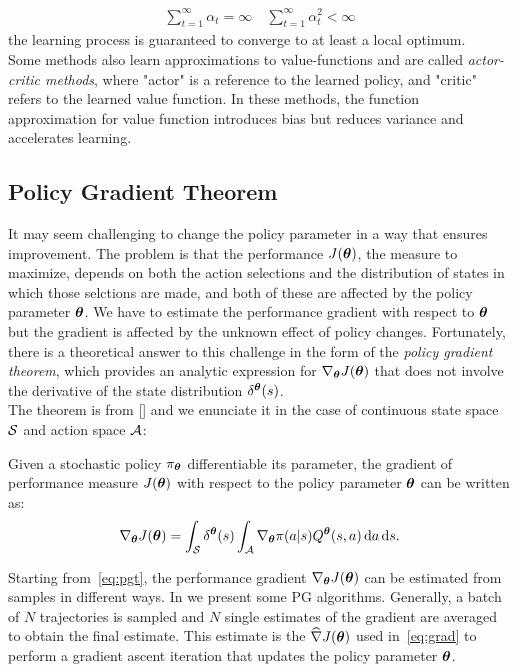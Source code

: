 \begin{align}\sum_{t=1}^{\infty}\alpha_t = \infty \quad \sum_{t=1}^{\infty}\alpha_t^2 < \infty\end{align}
the learning process is guaranteed to converge to at least a local optimum.\\
\newline
Some methods also learn approximations to value-functions and are called \emph{actor-critic methods}, where "actor" is a reference to the learned policy, and "critic" refers to the learned value function. In these methods, the function approximation for value function introduces bias but reduces variance and accelerates learning.

\subsection{Policy Gradient Theorem} \label{subsec:pgt}
It may seem challenging to change the policy parameter in a way that ensures improvement. The problem is that the performance $J(\boldsymbol{\theta})$, \ie the measure to maximize, depends on both the action selections and the distribution of states in which those selctions are made, and both of these are affected by the policy parameter $\boldsymbol{\theta}$. We have to estimate the performance gradient with respect to $\boldsymbol{\theta}$ but the gradient is affected by the unknown effect of policy changes. Fortunately, there is a theoretical answer to this challenge in the form of the \emph{policy gradient theorem}, which provides an analytic expression for $\nabla_{\boldsymbol{\theta}}J(\boldsymbol{\theta})$ that does not involve the derivative of the state distribution $\delta^{\boldsymbol{\theta}}(s)$.\\
\newline
The theorem is from [\cite{Sutton1999PolicyGM}] and we enunciate it in the case of continuous state space $\mathcal{S}$ and action space $\mathcal{A}$:
\begin{theorem}
	Given a stochastic policy $\pi_{\boldsymbol{\theta}}$ differentiable \wrt its parameter, the gradient of performance measure $J(\boldsymbol{\theta})$ with respect to the policy parameter $\boldsymbol{\theta}$ can be written as:
	\begin{align} 
	\nabla_{\boldsymbol{\theta}}J(\boldsymbol{\theta}) = \int_{\mathcal{S}} \delta^{\boldsymbol{\theta}}(s) \int_{\mathcal{A}} \nabla_{\boldsymbol{\theta}} \pi(a|s) Q^{\boldsymbol{\theta}}(s,a) \,\mathrm{d} a \,\mathrm{d} s. \label{eq:pgt}
	\end{align}
\end{theorem}
\noindent Starting from~\eqref{eq:pgt}, the performance gradient $\nabla_{\boldsymbol{\theta}}J(\boldsymbol{\theta})$ can be estimated from samples in different ways. In  we present some \ac{PG} algorithms. Generally, a batch of $N$ trajectories is sampled and $N$ single estimates of the gradient are averaged to obtain the final estimate. This estimate is the $\widehat{\nabla }J(\boldsymbol{\theta})$ used in~\eqref{eq:grad} to perform a gradient ascent iteration that updates the policy parameter $\boldsymbol{\theta}$.

